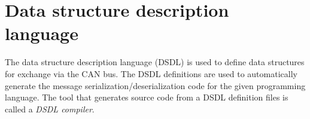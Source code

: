 \chapter{Data structure description language}\label{sec:dsdl}

The data structure description language (DSDL) is used to define data structures for exchange via the CAN bus.
The DSDL definitions are used to automatically generate the message serialization/deserialization code
for the given programming language.
The tool that generates source code from a DSDL definition files is called a \emph{DSDL compiler}.
